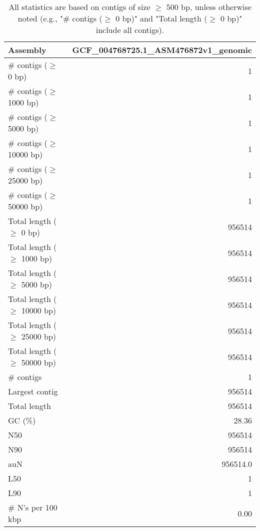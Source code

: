 \documentclass[12pt,a4paper]{article}
\begin{document}
\begin{table}[ht]
\begin{center}
\caption{All statistics are based on contigs of size $\geq$ 500 bp, unless otherwise noted (e.g., "\# contigs ($\geq$ 0 bp)" and "Total length ($\geq$ 0 bp)" include all contigs).}
\begin{tabular}{|l*{1}{|r}|}
\hline
Assembly & GCF\_004768725.1\_ASM476872v1\_genomic \\ \hline
\# contigs ($\geq$ 0 bp) & 1 \\ \hline
\# contigs ($\geq$ 1000 bp) & 1 \\ \hline
\# contigs ($\geq$ 5000 bp) & 1 \\ \hline
\# contigs ($\geq$ 10000 bp) & 1 \\ \hline
\# contigs ($\geq$ 25000 bp) & 1 \\ \hline
\# contigs ($\geq$ 50000 bp) & 1 \\ \hline
Total length ($\geq$ 0 bp) & 956514 \\ \hline
Total length ($\geq$ 1000 bp) & 956514 \\ \hline
Total length ($\geq$ 5000 bp) & 956514 \\ \hline
Total length ($\geq$ 10000 bp) & 956514 \\ \hline
Total length ($\geq$ 25000 bp) & 956514 \\ \hline
Total length ($\geq$ 50000 bp) & 956514 \\ \hline
\# contigs & 1 \\ \hline
Largest contig & 956514 \\ \hline
Total length & 956514 \\ \hline
GC (\%) & 28.36 \\ \hline
N50 & 956514 \\ \hline
N90 & 956514 \\ \hline
auN & 956514.0 \\ \hline
L50 & 1 \\ \hline
L90 & 1 \\ \hline
\# N's per 100 kbp & 0.00 \\ \hline
\end{tabular}
\end{center}
\end{table}
\end{document}

